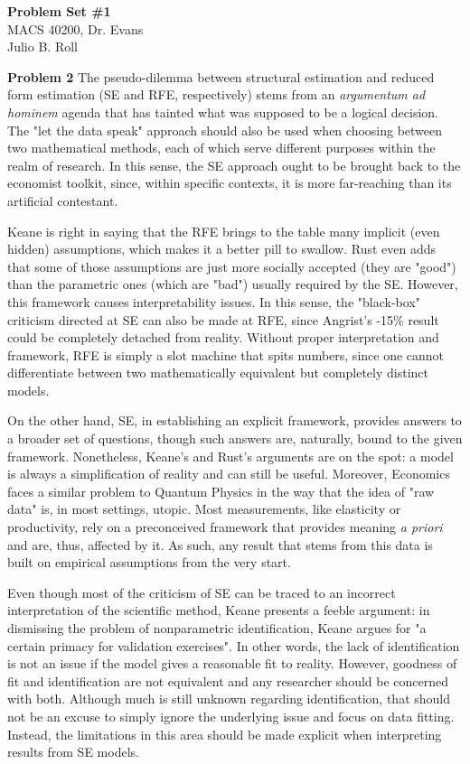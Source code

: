 \documentclass[letterpaper,12pt]{article}
\theoremstyle{definition}
\begin{document}
\begin{flushleft}
  \textbf{\large{Problem Set \#1}} \\
  MACS 40200, Dr. Evans \\
  Julio B. Roll
\end{flushleft}

\vspace{5mm}

\noindent\textbf{Problem 2}
The pseudo-dilemma between structural estimation and reduced form estimation (SE and RFE, respectively) stems from an \textit{argumentum ad hominem} agenda that has tainted what was supposed to be a logical decision. The "let the data speak" approach should also be used when choosing between two mathematical methods, each of which serve different purposes within the realm of research. In this sense, the SE approach ought to be brought back to the economist toolkit, since, within specific contexts, it is more far-reaching than its artificial contestant.

Keane is right in saying that the RFE brings to the table many implicit (even hidden) assumptions, which makes it a better pill to swallow. Rust even adds that some of those assumptions are just more socially accepted (they are "good") than the parametric ones (which are "bad") usually required by the SE. However, this framework causes interpretability issues. In this sense, the "black-box" criticism directed at SE can also be made at RFE, since Angrist's -15\% result could be completely detached from reality. Without proper interpretation and framework, RFE is simply a slot machine that spits numbers, since one cannot differentiate between two mathematically equivalent but completely distinct models.

On the other hand, SE, in establishing an explicit framework, provides answers to a broader set of questions, though such answers are, naturally, bound to the given framework. Nonetheless, Keane's and Rust's arguments are on the spot: a model is always a simplification of reality and can still be useful. Moreover, Economics faces a similar problem to Quantum Physics in the way that the idea of "raw data" is, in most settings, utopic. Most measurements, like elasticity or productivity, rely on a preconceived framework that provides meaning \textit{a priori} and are, thus, affected by it. As such, any result that stems from this data is built on empirical assumptions from the very start.

Even though most of the criticism of SE can be traced to an incorrect interpretation of the scientific method, Keane presents a feeble argument: in dismissing the problem of nonparametric identification, Keane argues for "a certain primacy for validation exercises". In other words, the lack of identification is not an issue if the model gives a reasonable fit to reality. However, goodness of fit and identification are not equivalent and any researcher should be concerned with both. Although much is still unknown regarding identification, that should not be an excuse to simply ignore the underlying issue and focus on data fitting. Instead, the limitations in this area should be made explicit when interpreting results from SE models.
\end{document}
